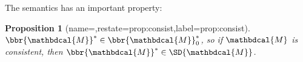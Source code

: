 \documentclass[letterpaper]{article} %
\theoremstyle{plain}
\newtheorem{prop}[theorem]{Proposition}
\theoremstyle{definition}
\theoremstyle{remark}
\newcommand{\begthm}[3][]{\begin{#2}[{name=#1},restate=#3,label=#3]}
\newcommand{\commentout}[1]{\ignorespaces}
\DeclareMathOperator*{\argmin}{arg\;min}
\newcommand\mat[1]{\mathbf{#1}}
\newcommand{\bp}[1][L]{\mat{p}_{\!_{#1}\!}}
\newcommand{\V}{\mathcal V}
\newcommand{\dg}[1]{\mathbdcal{#1}}
\begin{document}
\commentout{
    \begin{prop}\label{prop:convex-if-gamma-small}
      If $\dg M$ is a PDG and
      $\gamma < \min_L \beta_L^{\dg M}$, then
      $\bbr{\dg M}_\gamma$ is a strictly convex function of $\mu$.%
    \end{prop}

                              
                              
    \Cref{prop:convex-if-gamma-small} allows us to define our desired
    semantics by ensuring the limit%
    	\footnote{$\mu$ is in this limit iff there is a sequence $(\gamma_i, \mu_i)_{i \in \mathbb N}$ with $\gamma_i \to 0$ and $\mu_i \to \mu$ such that $\mu_i \in \bbr{\dg M}_{\gamma_i}$ for all $i$.}
     in \eqref{eq:uniqdist} is well-defined.
	
	\begin{equation}
		 \bbr{\dg M}_* := \lim_{\gamma\to 0^+}\argmin_{\mu \in
				   \Delta\V(\dg M)} \bbr{\dg M}_\gamma(\mu). 
		   \label{eq:uniqdist}
	\end{equation}
}
The semantics has an important property: 

\begthm{prop}{prop:consist}
	$\bbr{\dg M}^* \in \bbr{\dg M}_0^*$, so if $\dg M$ is consistent,
	then $\bbr{\dg M}^* \in \SD{\dg  M}$.
\end{prop}

\commentout{
In fact, it can be shown that $\bbr{\dg M}^*$ is the \emph{information
projection} 
\cite{KF09} of the product of every $\bp$ into
$\bbr{\dg M}_0^*$,  
which provides an alternate justification for many of the coming results.
}
\end{document}
